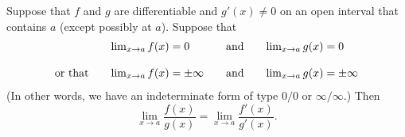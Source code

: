 \begin{frame}
\begin{theorem}
Suppose that $f$ and $g$ are differentiable and $g'(x) \neq 0$ on an open interval that contains $a$ (except possibly at $a$).  Suppose that
\[
\begin{array}{l@{\qquad}l@{\qquad}c@{\qquad}l}
& \lim_{x\rightarrow a} f(x) = 0 &
 \textrm{and} & \lim_{x\rightarrow a} g(x) = 0 \\
& & & \\
\textrm{or that} & \lim_{x\rightarrow a} f(x) = \pm\infty &
 \textrm{and} & \lim_{x\rightarrow a} g(x) = \pm\infty \\
\end{array}
\]
(In other words, we have an indeterminate form of type $0/0$ or $\infty / \infty$.)  Then
\[
\lim_{x\rightarrow a} \frac{f(x)}{g(x)} = \lim_{x\rightarrow a} \frac{f'(x)}{g'(x)}.
\]
\end{theorem}
\end{frame}

